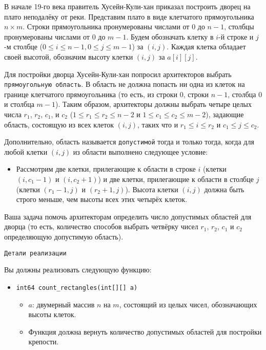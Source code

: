 В начале 19-го века правитель Хусейн-Кули-хан приказал построить дворец на
плато неподалёку от реки. Представим плато в виде клетчатого прямоугольника
$n \times m$. Строки прямоугольника пронумерованы числами от $0$ до $n-1$, столбцы
пронумерованы числами от $0$ до $m-1$. Будем обозначать клетку в $i$-й строке и $j$-м
столбце ($0 \leq i \leq n-1, 0 \leq j \leq m-1$) за $(i,j)$. Каждая клетка обладает своей
высотой, обозначим высоту клетки $(i,j)$ за  $a[i][j]$.

Для постройки дворца Хусейн-Кули-хан попросил архитекторов выбрать
\texttt{прямоугольную область}. В область не должна попасть ни одна из клеток на
границе клетчатого прямоугольника (то есть, из строки $0$, строки $n-1$, столбца $0$
и столбца $m-1$). Таким образом, архитекторы должны выбрать четыре целых
числа $r_1$, $r_2$, $c_1$, и $c_2$ ($1 \leq r_1 \leq r_2 \leq n-2$ и $1 \leq c_1 \leq c_2 \leq m-2$), задающие область, состоящую из всех клеток $(i, j)$, таких что и $r_1 \leq i \leq r_2$ и $c_1 \leq j \leq c_2$.

Дополнительно, область называется \texttt{допустимой} тогда и только тогда, когда для
любой клетки $(i, j)$ из области выполнено следующее условие:
\begin{itemize}
\item Рассмотрим две клетки, прилегающие к области в строке $i$ (клетки $(i, c_1-1)$ и $(i, c_2+1)$) и две клетки, прилегающие к области в столбце $j$ (клетки $(r_1-1, j)$ и $(r_2+1, j)$).
Высота клетки $(i,j)$ должна быть строго меньше, чем высоты
всех этих четырёх клеток.
\end{itemize}

Ваша задача помочь архитекторам определить число допустимых областей для
дворца (то есть, количество способов выбрать четвёрку чисел $r_1$, $r_2$, $c_1$ и $c_2$ 
определяющую допустимую область).

\texttt{Детали реализации}

Вы должны реализовать следующую функцию:

\begin{itemize}
\item \texttt{int64 count\_rectangles(int[][] a)}
\begin{itemize}
\item $a$: двумерный массив $n$ на $m$, состоящий из целых чисел, обозначающих
высоты клеток.
\item Функция должна вернуть количество допустимых областей для постройки
крепости.
\end{itemize}
\end{itemize}

